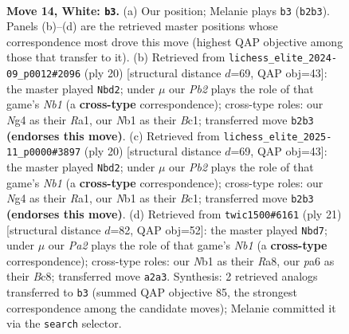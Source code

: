 \documentclass[11pt]{article}
\begin{document}
\clearpage

\begin{figure}[p]\centering
\begin{subfigure}{0.46\textwidth}\centering
\resizebox{\linewidth}{!}{%
\newchessgame
\chessboard[
  setfen={rnbr2k1/1p2bppp/pn1qp3/2p5/2pP2N1/4B1P1/PP2PPBP/RN1QRK2 w - - 0 14},
  showmover=false,
  pgfstyle=straightmove, color=movearrow, markmove={b2-b3}
]}
\caption{}
\end{subfigure}\hfill
\begin{subfigure}{0.46\textwidth}\centering
\resizebox{\linewidth}{!}{%
\newchessgame
\chessboard[
  setfen={r1bq1rk1/2p1bppp/p2p1n2/4n3/Pp2P3/1B3N2/1PP2PPP/RNBQR1K1 w - - 0 11},
  showmover=false,
  pgfstyle=straightmove, color=movearrow, markmove={b1-d2}
]}
\caption{}
\end{subfigure}
\\[4pt]
\begin{subfigure}{0.46\textwidth}\centering
\resizebox{\linewidth}{!}{%
\newchessgame
\chessboard[
  setfen={r1bq1rk1/2p1bppp/p2p1n2/4n3/Pp2P3/1B3N2/1PP2PPP/RNBQR1K1 w - - 0 11},
  showmover=false,
  pgfstyle=straightmove, color=movearrow, markmove={b1-d2}
]}
\caption{}
\end{subfigure}\hfill
\begin{subfigure}{0.46\textwidth}\centering
\resizebox{\linewidth}{!}{%
\newchessgame
\chessboard[
  setfen={rnbr2k1/1p2qppp/2p2n2/p1b1p3/2N1P3/P4NP1/1PP1QPBP/R1B2RK1 b - - 3 11},
  showmover=false,
  pgfstyle=straightmove, color=movearrow, markmove={b8-d7}
]}
\caption{}
\end{subfigure}
\caption{\textbf{Move 14, White: \texttt{b3}.} (a) Our position; Melanie plays \texttt{b3} (\texttt{b2b3}). Panels (b)--(d) are the retrieved master positions whose correspondence most drove this move (highest QAP objective among those that transfer to it). (b) Retrieved from \texttt{lichess\_elite\_2024-09\_p0012\#2096} (ply 20) [structural distance $d$=69, QAP obj=43]: the master played \texttt{Nbd2}; under $\mu$ our \emph{Pb2} plays the role of that game's \emph{Nb1} (a \textbf{cross-type} correspondence); cross-type roles: our \emph{N}g4 as their \emph{R}a1, our \emph{N}b1 as their \emph{B}c1; transferred move \texttt{b2b3} \textbf{(endorses this move)}. (c) Retrieved from \texttt{lichess\_elite\_2025-11\_p0000\#3897} (ply 20) [structural distance $d$=69, QAP obj=43]: the master played \texttt{Nbd2}; under $\mu$ our \emph{Pb2} plays the role of that game's \emph{Nb1} (a \textbf{cross-type} correspondence); cross-type roles: our \emph{N}g4 as their \emph{R}a1, our \emph{N}b1 as their \emph{B}c1; transferred move \texttt{b2b3} \textbf{(endorses this move)}. (d) Retrieved from \texttt{twic1500\#6161} (ply 21) [structural distance $d$=82, QAP obj=52]: the master played \texttt{Nbd7}; under $\mu$ our \emph{Pa2} plays the role of that game's \emph{Nb1} (a \textbf{cross-type} correspondence); cross-type roles: our \emph{N}b1 as their \emph{R}a8, our \emph{p}a6 as their \emph{B}c8; transferred move \texttt{a2a3}. Synthesis: 2 retrieved analogs transferred to \texttt{b3} (summed QAP objective 85, the strongest correspondence among the candidate moves); Melanie committed it via the \texttt{search} selector.}
\label{fig:thought-m26}
\end{figure}
\end{document}
